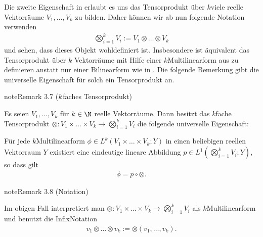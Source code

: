\documentclass[letterpaper,10pt,english]{jupyterBook}
\begin{document}
\sphinxAtStartPar
Die zweite Eigenschaft in {\hyperref[\detokenize{vektoranalysis/tensor:lem:natISO}]{}} erlaubt es uns das Tensorprodukt über \(k\)\sphinxhyphen{}viele reelle Vektorräume \(V_1,\ldots, V_k\) zu bilden.
Daher können wir ab nun folgende Notation verwenden
\begin{equation*}
\begin{split}\bigotimes_{i=1}^k V_i :=V_1\otimes\ldots\otimes V_k\end{split}
\end{equation*}
\sphinxAtStartPar
und sehen, dass dieses Objekt wohldefiniert ist.
Insbesondere ist äquivalent das Tensorprodukt über \(k\) Vektorräume mit Hilfe einer \(k\)\sphinxhyphen{}Multilinearform aus {\hyperref[\detokenize{vektoranalysis/multilinear:s-k-multilinearform}]{}} zu definieren anstatt nur einer Bilinearform wie in {\hyperref[\detokenize{vektoranalysis/tensor:def:tensor}]{}}.
Die folgende Bemerkung gibt die universelle Eigenschaft für solch ein Tensorprodukt an.
\label{vektoranalysis/tensor:rem:kfachesTensorprodukt}
\begin{sphinxadmonition}{note}{Remark 3.7 (\protect\(k\protect\)\sphinxhyphen{}faches Tensorprodukt)}



\sphinxAtStartPar
Es seien \(V_1,\ldots, V_k\) für \(k \in \N\) reelle Vektorräume.
Dann besitzt das \(k\)\sphinxhyphen{}fache Tensorprodukt \(\otimes \colon V_1 \times \ldots \times V_k \rightarrow \bigotimes_{i=1}^k V_i\) die folgende universelle Eigenschaft:

\sphinxAtStartPar
Für jede \(k\)\sphinxhyphen{}Multilinearform \(\phi\in L^k(V_1\times\ldots\times V_k; Y)\) in einen beliebigen reellen Vektorraum \(Y\) existiert eine eindeutige lineare Abbildung
\(p \in L^1(\bigotimes_{i=1}^k V_i; Y)\), so dass gilt
\begin{equation*}
\begin{split}\phi = p \circ \otimes.\end{split}
\end{equation*}\end{sphinxadmonition}
\label{vektoranalysis/tensor:remark-12}
\begin{sphinxadmonition}{note}{Remark 3.8 (Notation)}



\sphinxAtStartPar
Im obigen Fall interpretiert man \(\otimes: V_1\times\ldots\times V_k \rightarrow \bigotimes_{i=1}^k V_i\) als \(k\)\sphinxhyphen{}Multilinearform und benutzt die Infix\sphinxhyphen{}Notation
\begin{equation*}
\begin{split}v_1\otimes\ldots\otimes v_k := \otimes(v_1,\ldots, v_k).\end{split}
\end{equation*}\end{sphinxadmonition}
\end{document}
